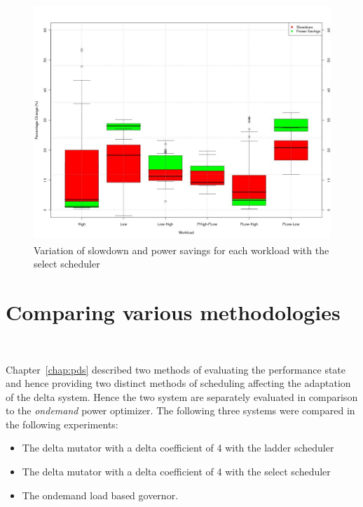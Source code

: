 \begin{figure}[h!]
  \begin{center}
    \includegraphics[height=3.5in]{figures/trends_workload_select.jpg}%
    \caption{Variation of slowdown and power savings for each workload with the select scheduler}
    \label{fig:workload_trends_select}
  \end{center}
\end{figure}

\section{Comparing various methodologies}~\label{sec:compare}

Chapter~\ref{chap:pds} described two methods of evaluating the performance state and hence
providing two distinct methods of scheduling affecting the adaptation of the delta system.
Hence the two system are separately evaluated in comparison to the \textit{ondemand}
power optimizer. The following three systems were compared in the following experiments:
\begin{itemize}
\item The delta mutator with a delta coefficient of 4 with the ladder scheduler
\item The delta mutator with a delta coefficient of 4 with the select scheduler
\item The ondemand load based governor.
\end{itemize}

